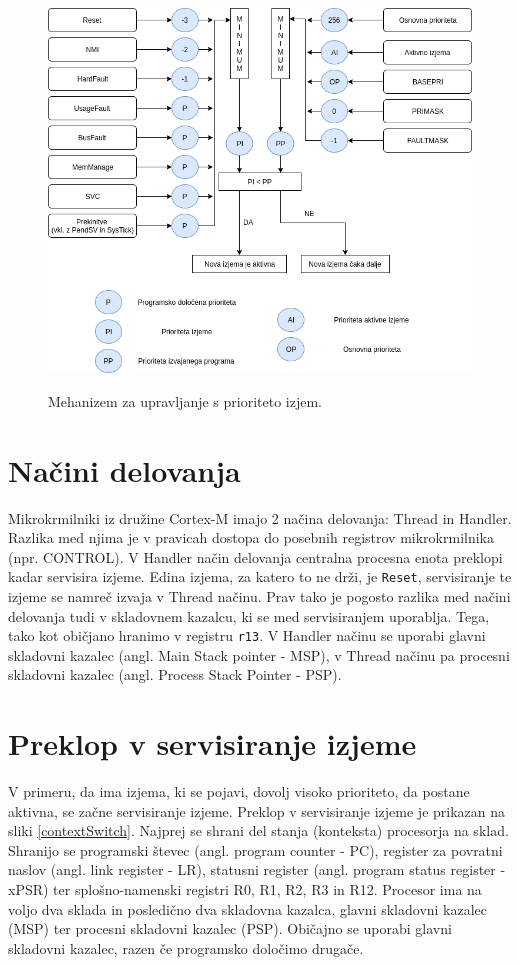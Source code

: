 \documentclass[12pt,letterpaper]{article}
\begin{document}
\begin{figure}[ht!]
  \centering
  \caption{Mehanizem za upravljanje s prioriteto izjem.}
  \includegraphics[width=360pt]{images/vaja6/prioriteta.png}
  \label{prioriteta}
\end{figure}

\newpage


\section*{Načini delovanja}

Mikrokrmilniki iz družine Cortex-M imajo 2 načina delovanja: Thread in Handler. Razlika med njima je v pravicah dostopa do posebnih registrov mikrokrmilnika (npr. CONTROL). V Handler način delovanja centralna procesna enota preklopi kadar servisira izjeme. Edina izjema, za katero to ne drži, je \texttt{Reset}, servisiranje te izjeme se namreč izvaja v Thread načinu.
Prav tako je pogosto razlika med načini delovanja tudi v skladovnem kazalcu, ki se med servisiranjem uporablja. Tega, tako kot običjano hranimo v registru \texttt{r13}. V Handler načinu se uporabi glavni skladovni kazalec (angl. Main Stack pointer - MSP), v Thread načinu pa procesni skladovni kazalec (angl. Process Stack Pointer - PSP). 

\section*{Preklop v servisiranje izjeme}

V primeru, da ima izjema, ki se pojavi, dovolj visoko prioriteto, da postane aktivna, se začne servisiranje izjeme. Preklop v servisiranje izjeme je prikazan na sliki \ref{contextSwitch}. Najprej se shrani del stanja (konteksta) procesorja na sklad. Shranijo se programski števec (angl. program counter - PC), register za povratni naslov (angl. link register - LR), statusni register (angl. program status register - xPSR) ter splošno-namenski registri R0, R1, R2, R3 in R12. Procesor ima na voljo dva sklada in posledično dva skladovna kazalca, glavni skladovni kazalec (MSP) ter procesni skladovni kazalec (PSP). Običajno se uporabi glavni skladovni kazalec, razen če programsko določimo drugače.
\end{document}
